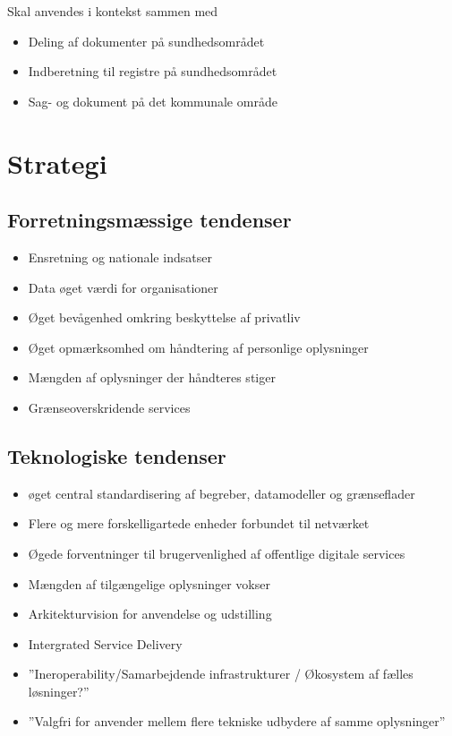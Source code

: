 Skal anvendes i kontekst sammen med

\begin{itemize}
\tightlist
\item
  Deling af dokumenter på sundhedsområdet
\item
  Indberetning til registre på sundhedsområdet
\item
  Sag- og dokument på det kommunale område
\end{itemize}

\section{Strategi}\label{strategi}

\subsection{Forretningsmæssige
tendenser}\label{forretningsmuxe6ssige-tendenser}

\begin{itemize}
\tightlist
\item
  Ensretning og nationale indsatser
\item
  Data øget værdi for organisationer
\item
  Øget bevågenhed omkring beskyttelse af privatliv
\item
  Øget opmærksomhed om håndtering af personlige oplysninger
\item
  Mængden af oplysninger der håndteres stiger
\item
  Grænseoverskridende services
\end{itemize}

\subsection{Teknologiske tendenser}\label{teknologiske-tendenser}

\begin{itemize}
\tightlist
\item
  øget central standardisering af begreber, datamodeller og grænseflader
\item
  Flere og mere forskelligartede enheder forbundet til netværket
\item
  Øgede forventninger til brugervenlighed af offentlige digitale
  services
\item
  Mængden af tilgængelige oplysninger vokser
\item
  Arkitekturvision for anvendelse og udstilling
\item
  Intergrated Service Delivery
\item
  ''Ineroperability/Samarbejdende infrastrukturer / Økosystem af fælles
  løsninger?''
\item
  ''Valgfri for anvender mellem flere tekniske udbydere af samme
  oplysninger''
\end{itemize}

